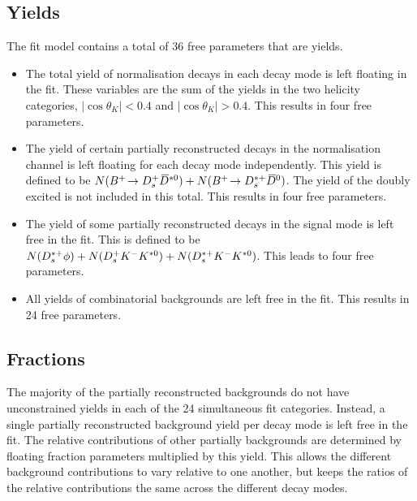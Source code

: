 \subsection{Yields}

The fit model contains a total of 36 free parameters that are yields.
\begin{itemize}
\item The total yield of normalisation decays in each \Dsp decay mode is left floating in the fit. These variables are the sum of the yields in the two helicity categories, $|\cos\theta_{K}| < 0.4$ and $|\cos\theta_{K}| > 0.4$. This results in four free parameters.
\item The yield of certain partially reconstructed decays in the normalisation channel is left floating for each \Dsp decay mode independently. This yield is defined to be $N({{{B}^+}}\!\rightarrow {\ensuremath{{D}^+_{s}}}{\ensuremath{{\kern 0.2em\overline{\kern -0.2em D}{}}{}^{*0}}})+ N({{{B}^+}}\!\rightarrow {\ensuremath{{D}^{*+}_{s}}}{\ensuremath{{\kern 0.2em\overline{\kern -0.2em D}{}}{}^0}})$. The yield of the doubly excited \decay{\Bp}{\Dssp\Dzb} is not included in this total. This results in four free parameters.
\item The yield of some partially reconstructed decays in the signal mode is left free in the fit. This is defined to be $N({{D}^{*+}_{s}}\phi) + N({{D}^+_{s}}{{K}^-}{{K}^{*0}}) + N({{D}^{*+}_{s}}{{K}^-}{{K}^{*0}})$. This leads to four free parameters. 
\item All yields of combinatorial backgrounds are left free in the fit. This results in 24 free parameters.
\end{itemize}



\subsection{Fractions}




The majority of the partially reconstructed backgrounds do not have unconstrained yields in each of the 24 simultaneous fit categories. 
Instead, a single partially reconstructed background yield per \Dsp decay mode is left free in the fit. The relative contributions of other partially backgrounds are determined by floating fraction parameters multiplied by this yield. 
This allows the different background contributions to vary relative to one another, but keeps the ratios of the relative contributions the same across the different \Dsp decay modes.

